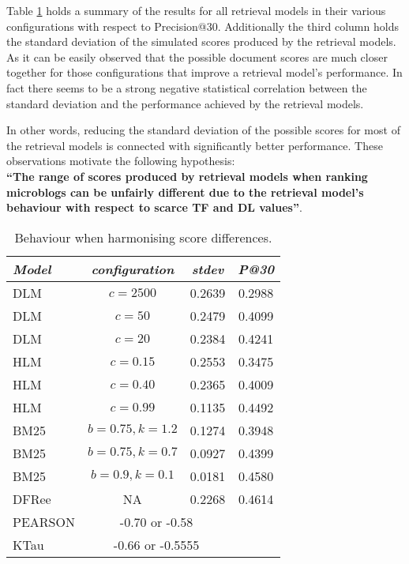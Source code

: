 Table \ref{stdevharmonising} holds a summary of the results for all retrieval models in their various configurations with respect to Precision@30. Additionally the third column holds the standard deviation of the simulated scores produced by the retrieval models. As it can be easily observed that the possible document scores are much closer together for those configurations that improve a retrieval model's performance. In fact there seems to be a strong negative statistical correlation between the standard deviation and the performance achieved by the retrieval models.

In other words, reducing the standard deviation of the possible scores for most of the retrieval models is connected with significantly better performance. These observations motivate the following hypothesis:\\

\textbf{\textquotedblleft The range of scores produced by retrieval models when ranking microblogs can be unfairly different due to the retrieval model's behaviour with respect to scarce TF and DL values\textquotedblright}.\\



\begin{table}[]
	\caption{Behaviour when harmonising score differences.}
	\centering
	\begin{tabular}{l|c|c|c} 	
		\textit{\textbf{Model}} & 
		\textit{\textbf{configuration}} & 
		\textit{\textbf{stdev}} & 
		\textit{\textbf{P@30}} 	
		\tabularnewline
		\hline
		DLM & \(c=2500\) & 0.2639 & 0.2988 \\
		DLM & \(c=50\) & 0.2479 & 0.4099 \\
		DLM & \(c=20\) & 0.2384 & 0.4241 \\
		\hline	
		HLM & \(c=0.15\) & 0.2553 & 0.3475\\
		HLM & \(c=0.40\) & 0.2365 & 0.4009\\
		HLM & \(c=0.99\) & 0.1135 & 0.4492\\
		\hline
		BM25 & \(b=0.75, k=1.2\) & 0.1274 & 0.3948\\
		BM25 & \(b=0.75, k=0.7\) & 0.0927 & 0.4399\\
		BM25 & \(b=0.9, k=0.1\) & 0.0181 & 0.4580\\
		\hline
		DFRee & NA & 0.2268 & 0.4614\\
		\hline
		\hline    
		PEARSON & \multicolumn{2}{|c}{-0.70 or -0.58}    \\
		KTau & \multicolumn{2}{|c}{-0.66 or -0.5555}    \\
	\end{tabular}
	\label{stdevharmonising}
\end{table}

